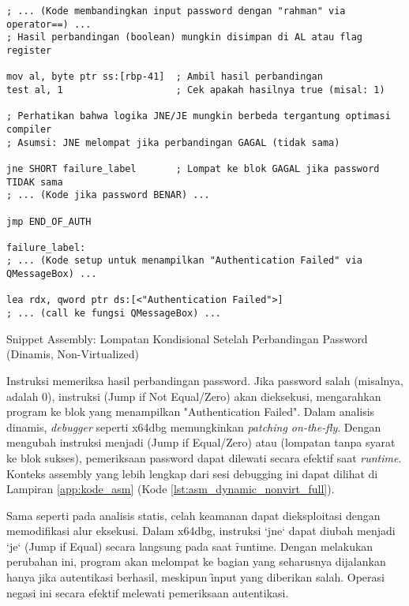 \begin{listing}[H]
    \begin{verbatim}
; ... (Kode membandingkan input password dengan "rahman" via operator==) ...
; Hasil perbandingan (boolean) mungkin disimpan di AL atau flag register

mov al, byte ptr ss:[rbp-41]  ; Ambil hasil perbandingan
test al, 1                    ; Cek apakah hasilnya true (misal: 1)

; Perhatikan bahwa logika JNE/JE mungkin berbeda tergantung optimasi compiler
; Asumsi: JNE melompat jika perbandingan GAGAL (tidak sama)

jne SHORT failure_label       ; Lompat ke blok GAGAL jika password TIDAK sama
; ... (Kode jika password BENAR) ...

jmp END_OF_AUTH

failure_label:
; ... (Kode setup untuk menampilkan "Authentication Failed" via QMessageBox) ...

lea rdx, qword ptr ds:[<"Authentication Failed">]
; ... (call ke fungsi QMessageBox) ...

\end{verbatim}
\caption{Snippet Assembly: Lompatan Kondisional Setelah Perbandingan Password (Dinamis, Non-Virtualized)}
\label{lst:asm_dynamic_nonvirt_snippet_rev} %
\end{listing}

Instruksi  memeriksa hasil perbandingan password. Jika password salah (misalnya,  adalah 0), instruksi  (Jump if Not Equal/Zero) akan dieksekusi, mengarahkan program ke blok yang menampilkan "Authentication Failed". Dalam analisis dinamis, \textit{debugger} seperti x64dbg memungkinkan \textit{patching on-the-fly}. Dengan mengubah instruksi  menjadi  (Jump if Equal/Zero) atau  (lompatan tanpa syarat ke blok sukses), pemeriksaan password dapat dilewati secara efektif saat \textit{runtime}. Konteks assembly yang lebih lengkap dari sesi debugging ini dapat dilihat di Lampiran \ref{app:kode_asm} (Kode \ref{lst:asm_dynamic_nonvirt_full}).

Sama seperti pada analisis statis, celah keamanan dapat dieksploitasi dengan memodifikasi alur eksekusi. Dalam x64dbg, instruksi `jne` dapat diubah menjadi `je` (Jump if Equal) secara langsung pada saat \f{runtime}. Dengan melakukan perubahan ini, program akan melompat ke bagian yang seharusnya dijalankan hanya jika autentikasi berhasil, meskipun \f{input} yang diberikan salah. Operasi negasi ini secara efektif melewati pemeriksaan autentikasi.

